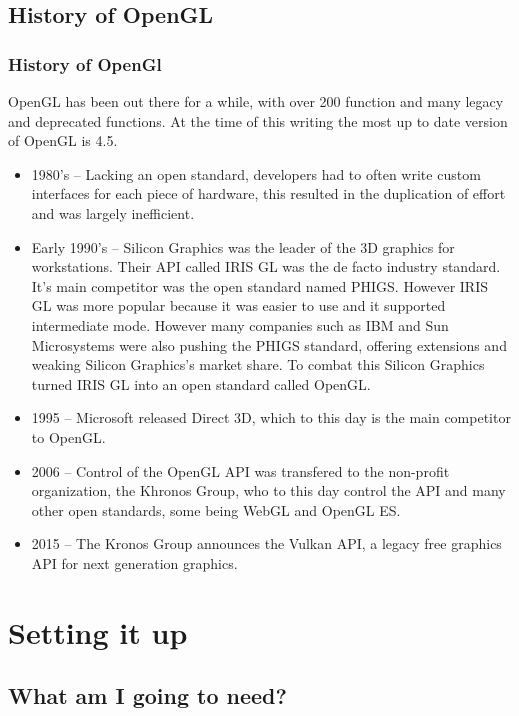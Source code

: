 \documentclass{beamer}
\begin{document}
          \subsection{History of OpenGL}
          \begin{frame}
            \frametitle{History of OpenGl}
            OpenGL has been out there for a while, with over 200 function and many legacy and deprecated functions. At the time of this writing the most up to date version of OpenGL is 4.5.
            \begin{scriptsize}
              \begin{itemize}
              \item 1980's -- Lacking an open standard, developers had to often write custom interfaces for each piece of hardware, this resulted in the duplication of effort and was largely inefficient.  
              \item Early 1990's -- Silicon Graphics was the leader of the 3D graphics for workstations. Their API called IRIS GL was the de facto industry standard. It's main competitor was the open standard named PHIGS. However IRIS GL was more popular because it was easier to use and it supported intermediate mode. However many companies such as IBM and Sun Microsystems were also pushing the PHIGS standard, offering extensions and weaking Silicon Graphics's market share. To combat this Silicon Graphics turned IRIS GL into an open standard called OpenGL.
              \item 1995 -- Microsoft released Direct 3D, which to this day is the main competitor to OpenGL.
              \item 2006 -- Control of the OpenGL API was transfered to the non-profit organization, the Khronos Group, who to this day control the API and many other open standards, some being WebGL and OpenGL ES.
              \item 2015 -- The Kronos Group announces the Vulkan API, a legacy free graphics API for next generation graphics.
              \end{itemize}
            \end{scriptsize}

          \end{frame}

          \section{Setting it up}
          \subsection{What am I going to need?}
\end{document}
